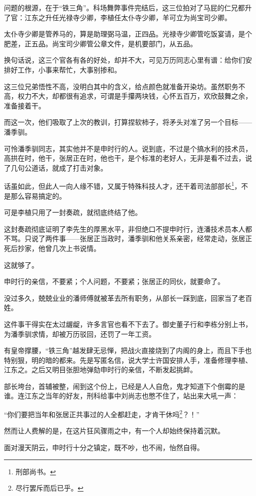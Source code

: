 \begin{multicols}{\theparacolNo}
问题的根源，在于“铁三角”。科场舞弊事件完结后，这三位拍对了马屁的仁兄都升了官：江东之升任光禄寺少卿，李植任太仆寺少卿，羊可立为尚宝司少卿。

太仆寺少卿是管养马的，算是助理弼马温，正四品。光禄寺少卿管吃饭宴请，是个肥差，正五品。尚宝司少卿管公章文件，是机要部门，从五品。

换句话说，这三个官各有各的好处，却并不大，可见万历同志心里有谱：给你们安排好工作，小事来帮忙，大事别掺和。

这三位兄弟悟性不高，没明白其中的含义，给点颜色就准备开染坊。虽然职务不高，权力不大，却都很有追求，可谓是手攥两块钱，心怀五百万，欢欣鼓舞之余，准备接着干。

而这一次，他们吸取了上次的教训，打算捏软柿子，将矛头对准了另一个目标——潘季驯。

可怜潘季驯同志，其实他并不是申时行的人。说到底，不过是个搞水利的技术员，高拱在时，他干，张居正在时，他也干，是个标准的老好人，无非是看不过去，说了几句公道话，就成了打击对象。

话虽如此，但此人一向人缘不错，又属于特殊科技人才，还干着司法部部长\footnote{刑部尚书。}，不是那么容易搞定的。

可是李植只用了一封奏疏，就彻底终结了他。

这封奏疏彻底证明了李先生的厚黑水平，非但绝口不提申时行，连潘技术员本人都不骂。只说了两件事——张居正当政时，潘季驯和他关系亲密，经常走动，张居正死后抄家，他曾几次上书说情。

这就够了。

申时行的亲信，不要紧；个人问题，不要紧；张居正的同伙，就要命了。

没过多久，兢兢业业的潘师傅就被革去所有职务，从部长一踩到底，回家当了老百姓。

这件事干得实在太过龌龊，许多言官也看不下去了。御史董子行和李栋分别上书，为潘季驯求情，却被万历驳回，还罚了一年工资。

有皇帝撑腰，“铁三角”越发肆无忌惮，把战火直接烧到了内阁的身上，而且下手也特别狠，明的暗的都来。先是写匿名信，说大学士许国安排人手，准备修理李植、江东之。之后又明目张胆地弹劾申时行的亲信，不断发起挑衅。

部长垮台，首辅被整，闹到这个份上，已经是人人自危，鬼才知道下个倒霉的是谁。连江东之当年的好友，刑科给事中刘尚志也憋不住了，站出来大吼一声：

“你们要把当年和张居正共事过的人全都赶走，才肯干休吗\footnote{尽行罢斥而后已乎。}？！”

然而让人费解的是，在这片狂风骤雨之中，有一个人却始终保持着沉默。

面对漫天阴云，申时行十分之镇定，既不吵，也不闹，怡然自得。


\end{multicols}
